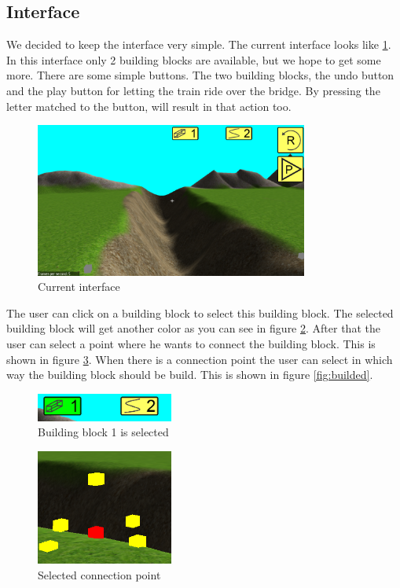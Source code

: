 \subsection{Interface}
We decided to keep the interface very simple. The current interface looks like \ref{fig:gui}. In this interface only 2 building blocks are available, but we hope to get some more. There are some simple buttons. The two building blocks, the undo button and the play button for letting the train ride over the bridge. By pressing the letter matched to the button, will result in that action too.
\begin{figure}[H]
    \centering
    \includegraphics[width=0.8\textwidth]{screenshots/GUI.png}
    \caption{Current interface}
    \label{fig:gui}
\end{figure}
The user can click on a building block to select this building block. The selected building block will get another color as you can see in figure \ref{fig:bbs}. After that the user can select a point where he wants to connect the building block. This is shown in figure \ref{fig:scp}. When there is a connection point the user can select in which way the building block should be build. This is shown in figure \ref{fig:builded}.
\begin{figure}[H]
    \centering
    \includegraphics[width=0.4\textwidth]{screenshots/BuildingBlockSelected.png}
    \caption{Building block 1 is selected}
    \label{fig:bbs}
\end{figure}
\begin{figure}[H]
    \centering
    \includegraphics[width=0.4\textwidth]{screenshots/select.png}
    \caption{Selected connection point}
    \label{fig:scp}
\end{figure}
